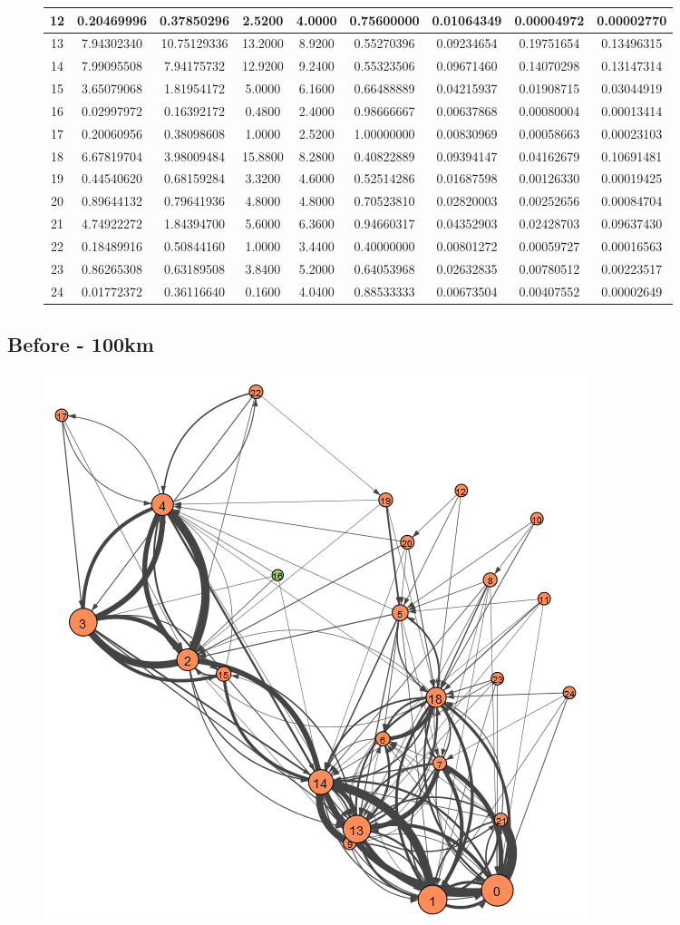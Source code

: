 \documentclass[12pt,a4paper]{thesis}
\begin{document}
\begin{figure}[H]
\begin{tabular}{|c|c|c|c|c|c|c|c|c|}
\hline	12	&	0.20469996	&	0.37850296	&	2.5200	&	4.0000	&	0.75600000	&	0.01064349	&	0.00004972	&	0.00002770	\\
\hline	13	&	7.94302340	&	10.75129336	&	13.2000	&	8.9200	&	0.55270396	&	0.09234654	&	0.19751654	&	0.13496315	\\
\hline	14	&	7.99095508	&	7.94175732	&	12.9200	&	9.2400	&	0.55323506	&	0.09671460	&	0.14070298	&	0.13147314	\\
\hline	15	&	3.65079068	&	1.81954172	&	5.0000	&	6.1600	&	0.66488889	&	0.04215937	&	0.01908715	&	0.03044919	\\
\hline	16	&	0.02997972	&	0.16392172	&	0.4800	&	2.4000	&	0.98666667	&	0.00637868	&	0.00080004	&	0.00013414	\\
\hline	17	&	0.20060956	&	0.38098608	&	1.0000	&	2.5200	&	1.00000000	&	0.00830969	&	0.00058663	&	0.00023103	\\
\hline	18	&	6.67819704	&	3.98009484	&	15.8800	&	8.2800	&	0.40822889	&	0.09394147	&	0.04162679	&	0.10691481	\\
\hline	19	&	0.44540620	&	0.68159284	&	3.3200	&	4.6000	&	0.52514286	&	0.01687598	&	0.00126330	&	0.00019425	\\
\hline	20	&	0.89644132	&	0.79641936	&	4.8000	&	4.8000	&	0.70523810	&	0.02820003	&	0.00252656	&	0.00084704	\\
\hline	21	&	4.74922272	&	1.84394700	&	5.6000	&	6.3600	&	0.94660317	&	0.04352903	&	0.02428703	&	0.09637430	\\
\hline	22	&	0.18489916	&	0.50844160	&	1.0000	&	3.4400	&	0.40000000	&	0.00801272	&	0.00059727	&	0.00016563	\\
\hline	23	&	0.86265308	&	0.63189508	&	3.8400	&	5.2000	&	0.64053968	&	0.02632835	&	0.00780512	&	0.00223517	\\
\hline	24	&	0.01772372	&	0.36116640	&	0.1600	&	4.0400	&	0.88533333	&	0.00673504	&	0.00407552	&	0.00002649	\\
\hline 
\end{tabular} 
\end{figure}



\subsection{Before - 100km}

\begin{figure}[H]
\centering
\includegraphics[width=0.35\linewidth]{./BeforeViz/ariadne100}
\caption{}
\label{fig:ariadneB100}
\end{figure}
\end{document}
